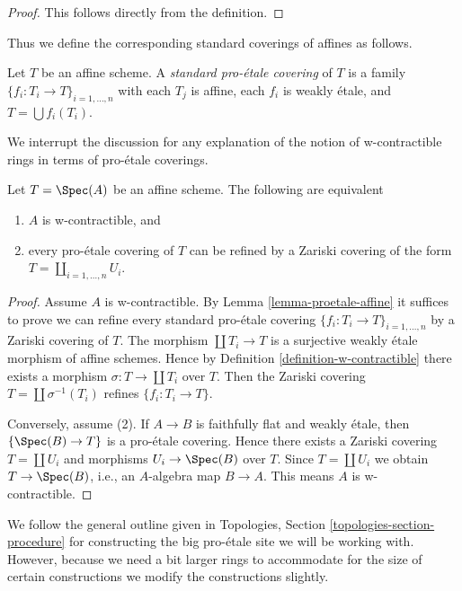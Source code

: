 \begin{proof}
This follows directly from the definition.
\end{proof}

\noindent
Thus we define the corresponding standard coverings of affines as follows.

\begin{definition}
\label{definition-standard-proetale}
Let $T$ be an affine scheme. A {\it standard pro-\'etale covering}
of $T$ is a family $\{f_i : T_i \to T\}_{i = 1, \ldots, n}$
with each $T_j$ is affine, each $f_i$ is weakly \'etale, and
$T = \bigcup f_i(T_i)$.
\end{definition}

\noindent
We interrupt the discussion for any explanation of the notion
of w-contractible rings in terms of pro-\'etale coverings.

\begin{lemma}
\label{lemma-w-contractible-proetale-cover}
Let $T = \Spec(A)$ be an affine scheme. The following are equivalent
\begin{enumerate}
\item $A$ is w-contractible, and
\item every pro-\'etale covering of $T$ can be refined by
a Zariski covering of the form $T = \coprod_{i = 1, \ldots, n} U_i$.
\end{enumerate}
\end{lemma}

\begin{proof}
Assume $A$ is w-contractible. By Lemma \ref{lemma-proetale-affine}
it suffices to prove we can refine every standard pro-\'etale covering
$\{f_i : T_i \to T\}_{i = 1, \ldots, n}$ by a Zariski covering of $T$.
The morphism $\coprod T_i \to T$ is a surjective weakly \'etale morphism
of affine schemes. Hence by Definition \ref{definition-w-contractible}
there exists a morphism $\sigma : T \to \coprod T_i$ over $T$.
Then the Zariski covering $T = \coprod \sigma^{-1}(T_i)$
refines $\{f_i : T_i \to T\}$.

\medskip\noindent
Conversely, assume (2). If $A \to B$ is faithfully flat and weakly \'etale,
then $\{\Spec(B) \to T\}$ is a pro-\'etale covering.
Hence there exists a Zariski covering $T = \coprod U_i$
and morphisms $U_i \to \Spec(B)$ over $T$. Since $T = \coprod U_i$
we obtain $T \to \Spec(B)$, i.e., an $A$-algebra map $B \to A$.
This means $A$ is w-contractible.
\end{proof}

\noindent
We follow the general outline given in
Topologies, Section \ref{topologies-section-procedure}
for constructing the big pro-\'etale site we will be working with.
However, because we need a bit larger rings to accommodate for the size
of certain constructions we modify the constructions slightly.


